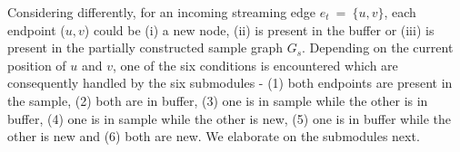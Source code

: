  Considering differently, for an incoming  streaming edge $e_t~=~\{u,v\}$, each endpoint ($u,v$) could be (i) a new node, %
(ii) is present in the buffer or (iii) is present in the partially constructed  sample graph $G_s$. Depending on the current position of $u$ and $v$, one of the six conditions is encountered which are consequently handled by the six submodules - 
(1) both endpoints are present in the sample, (2) both are in buffer, (3) one is in sample while the other is in buffer, (4) one is in sample while the other is new, (5) one is in buffer while the other is new and (6) both are new. 
We elaborate on the submodules next. 
